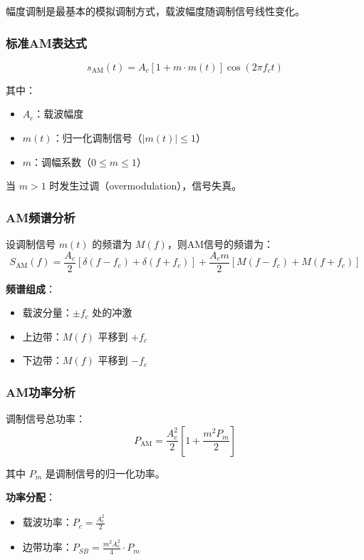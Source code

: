幅度调制是最基本的模拟调制方式，载波幅度随调制信号线性变化。

\subsubsection{标准AM表达式}

\begin{equation}
    s_{\text{AM}}(t) = A_c[1 + m \cdot m(t)]\cos(2\pi f_c t)
\end{equation}

其中：
\begin{itemize}
    \item $A_c$：载波幅度
    \item $m(t)$：归一化调制信号（$|m(t)| \leq 1$）
    \item $m$：调幅系数（$0 \leq m \leq 1$）
\end{itemize}

当 $m > 1$ 时发生过调（overmodulation），信号失真。

\subsubsection{AM频谱分析}

设调制信号 $m(t)$ 的频谱为 $M(f)$，则AM信号的频谱为：
\begin{equation}
    S_{\text{AM}}(f) = \frac{A_c}{2}[\delta(f - f_c) + \delta(f + f_c)] + \frac{A_c m}{2}[M(f - f_c) + M(f + f_c)]
\end{equation}

\textbf{频谱组成}：
\begin{itemize}
    \item 载波分量：$\pm f_c$ 处的冲激
    \item 上边带：$M(f)$ 平移到 $+f_c$
    \item 下边带：$M(f)$ 平移到 $-f_c$
\end{itemize}

\subsubsection{AM功率分析}

调制信号总功率：
\begin{equation}
    P_{\text{AM}} = \frac{A_c^2}{2}[1 + \frac{m^2 P_m}{2}]
\end{equation}

其中 $P_m$ 是调制信号的归一化功率。

\textbf{功率分配}：
\begin{itemize}
    \item 载波功率：$P_c = \frac{A_c^2}{2}$
    \item 边带功率：$P_{SB} = \frac{m^2 A_c^2}{4} \cdot P_m$
\end{itemize}

